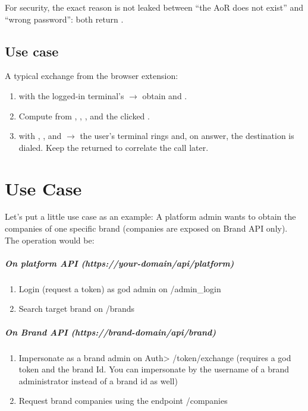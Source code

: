 \documentclass[letterpaper,10pt,english]{sphinxmanual}
\begin{document}
For security, the exact reason is not leaked between ``the AoR does not exist'' and
``wrong password'': both return .


\section{Use case}
\label{api_rest/click2call:use-case}
A typical exchange from the browser extension:
\begin{enumerate}
\item {} 
 with the logged-in terminal's  \(\rightarrow\) obtain  and
.

\item {} 
Compute  from , , ,  and the
clicked .

\item {} 
 with , ,  and  \(\rightarrow\) the
user's terminal rings and, on answer, the destination is dialed. Keep the
returned  to correlate the call later.

\end{enumerate}


\chapter{Use Case}
\label{api_rest/use_case:use-case}\label{api_rest/use_case::doc}\label{api_rest/use_case:id1}
Let's put a little use case as an example: A platform admin wants to obtain the companies of one specific brand (companies are exposed on Brand API only). The operation would be:
\paragraph{On platform API (https://your-domain/api/platform)}
\begin{enumerate}
\item {} 
Login (request a token) as god admin on /admin\_login

\item {} 
Search target brand on /brands

\end{enumerate}
\paragraph{On Brand API (https://brand-domain/api/brand)}
\begin{enumerate}
\item {} 
Impersonate as a brand admin on Auth\textgreater{} /token/exchange (requires a god token and the brand Id. You can impersonate by the username of a brand administrator instead of a brand id as well)

\item {} 
Request brand companies using the endpoint /companies

\end{enumerate}
\end{document}
